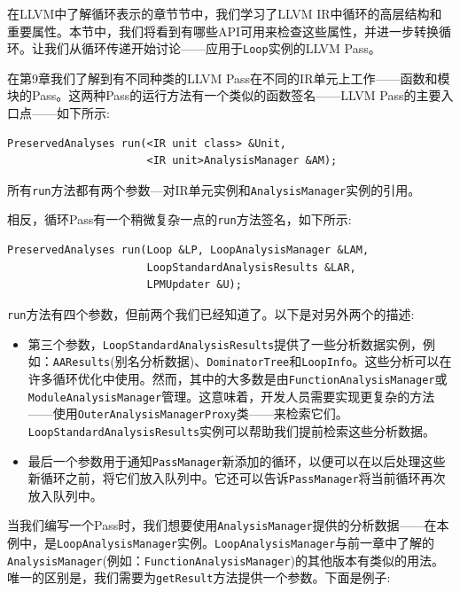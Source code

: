 
在LLVM中了解循环表示的章节节中，我们学习了LLVM IR中循环的高层结构和重要属性。本节中，我们将看到有哪些API可用来检查这些属性，并进一步转换循环。让我们从循环传递开始讨论——应用于\texttt{Loop}实例的LLVM Pass。

在第9章我们了解到有不同种类的LLVM Pass在不同的IR单元上工作——函数和模块的Pass。这两种Pass的运行方法有一个类似的函数签名——LLVM Pass的主要入口点——如下所示:

\begin{lstlisting}[style=styleCXX]
PreservedAnalyses run(<IR unit class> &Unit,
					  <IR unit>AnalysisManager &AM);
\end{lstlisting}

所有\texttt{run}方法都有两个参数—对IR单元实例和\texttt{AnalysisManager}实例的引用。

相反，循环Pass有一个稍微复杂一点的\texttt{run}方法签名，如下所示:

\begin{lstlisting}[style=styleCXX]
PreservedAnalyses run(Loop &LP, LoopAnalysisManager &LAM,
					  LoopStandardAnalysisResults &LAR,
					  LPMUpdater &U);
\end{lstlisting}

\texttt{run}方法有四个参数，但前两个我们已经知道了。以下是对另外两个的描述:

\begin{itemize}
\item 第三个参数，\texttt{LoopStandardAnalysisResults}提供了一些分析数据实例，例如：\texttt{AAResults}(别名分析数据)、\texttt{DominatorTree}和\texttt{LoopInfo}。这些分析可以在许多循环优化中使用。然而，其中的大多数是由\texttt{FunctionAnalysisManager}或\texttt{ModuleAnalysisManager}管理。这意味着，开发人员需要实现更复杂的方法——使用\texttt{OuterAnalysisManagerProxy}类——来检索它们。\texttt{LoopStandardAnalysisResults}实例可以帮助我们提前检索这些分析数据。

\item 最后一个参数用于通知\texttt{PassManager}新添加的循环，以便可以在以后处理这些新循环之前，将它们放入队列中。它还可以告诉\texttt{PassManager}将当前循环再次放入队列中。

\end{itemize}

当我们编写一个Pass时，我们想要使用\texttt{AnalysisManager}提供的分析数据——在本例中，是\texttt{LoopAnalysisManager}实例。\texttt{LoopAnalysisManager}与前一章中了解的\texttt{AnalysisManager}(例如：\texttt{FunctionAnalysisManager})的其他版本有类似的用法。唯一的区别是，我们需要为\texttt{getResult}方法提供一个参数。下面是例子:

